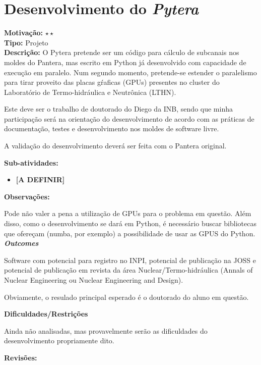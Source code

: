 \chapter{Desenvolvimento do \textit{Pytera}}
\label{pytera}

\textbf{Motivação:} $\star\star$\\

\textbf{Tipo:} Projeto\\

\textbf{Descrição:} O Pytera pretende ser um código para cálculo de subcanais 
nos moldes do Pantera, mas escrito em Python já desenvolvido com capacidade 
de execução em paralelo. Num segundo momento, pretende-se estender o paralelismo 
para tirar proveito das placas gŕaficas (GPUs) presentes no cluster do Laboratório 
de Termo-hidráulica e Neutrônica (LTHN).

Este deve ser o trabalho de doutorado do Diego da INB, sendo que minha participação 
será na orientação do desenvolvimento de acordo com as práticas de documentação, 
testes e desenvolvimento nos moldes de software livre.

A validação do desenvolvimento deverá ser feita com o Pantera original.

\textbf{Sub-atividades:}

\begin{itemize}
	\item \textbf{[A DEFINIR]}
\end{itemize}

\textbf{Observações:}

Pode não valer a pena a utilização de GPUs para o problema em questão. Além disso, 
como o desenvolvimento se dará em Python, é necessário buscar bibliotecas que 
ofereçam (numba, por exemplo) a possibilidade de usar as GPUS do Python.\\

\textbf{\textit{Outcomes}}

Software com potencial para registro no INPI, potencial de publicação na JOSS e 
potencial de publicação em revista da área Nuclear/Termo-hidráulica (Annals of 
Nuclear Engineering ou Nuclear Engineering and Design).

Obviamente, o resulado principal esperado é o doutorado do aluno em questão.

\textbf{Dificuldades/Restrições}

Ainda não analisadas, mas provavelmente serão as dificuldades do desenvolvimento 
propriamente dito.

\textbf{Revisões:}

\date{\today}
